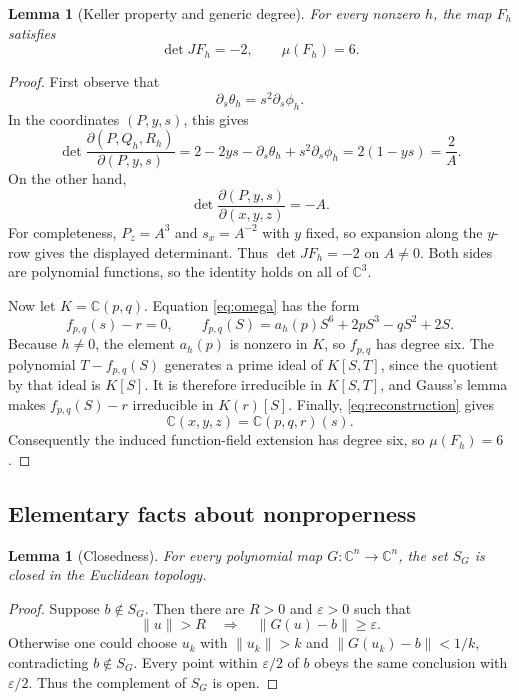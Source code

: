 \documentclass[11pt]{article}
\newtheorem{lemma}[theorem]{Lemma}
\newcommand{\C}{\mathbb{C}}
\begin{document}
\begin{lemma}[Keller property and generic degree]
\label{lem:keller-degree}
For every nonzero $h$, the map $F_h$ satisfies
\[
 \det JF_h=-2,
 \qquad
 \mu(F_h)=6.
\]
\end{lemma}

\begin{proof}
First observe that
\[
 \partial_s\theta_h=s^2\partial_s\phi_h.
\]
In the coordinates $(P,y,s)$, this gives
\[
 \det\frac{\partial(P,Q_h,R_h)}{\partial(P,y,s)}
 =2-2ys-\partial_s\theta_h+s^2\partial_s\phi_h
 =2(1-ys)=\frac{2}{A}.
\]
On the other hand,
\[
 \det\frac{\partial(P,y,s)}{\partial(x,y,z)}=-A.
\]
For completeness, $P_z=A^3$ and $s_x=A^{-2}$ with $y$ fixed, so expansion
along the $y$-row gives the displayed determinant.  Thus $\det JF_h=-2$ on
$A\ne0$.  Both sides are polynomial functions, so the identity holds on all
of $\C^3$.

Now let $K=\C(p,q)$.  Equation \eqref{eq:omega} has the form
\[
 f_{p,q}(s)-r=0,
 \qquad
 f_{p,q}(S)=a_h(p)S^6+2pS^3-qS^2+2S.
\]
Because $h\ne0$, the element $a_h(p)$ is nonzero in $K$, so $f_{p,q}$ has
degree six.  The polynomial $T-f_{p,q}(S)$ generates a prime ideal of
$K[S,T]$, since the quotient by that ideal is $K[S]$.  It is therefore
irreducible in $K[S,T]$, and Gauss's lemma makes $f_{p,q}(S)-r$ irreducible
in $K(r)[S]$.  Finally, \eqref{eq:reconstruction} gives
\[
 \C(x,y,z)=\C(p,q,r)(s).
\]
Consequently the induced function-field extension has degree six, so
$\mu(F_h)=6$.
\end{proof}

\subsection{Elementary facts about nonproperness}

\begin{lemma}[Closedness]
\label{lem:closed}
For every polynomial map $G:\C^n\to\C^n$, the set $S_G$ is closed in the
Euclidean topology.
\end{lemma}

\begin{proof}
Suppose $b\notin S_G$.  Then there are $R>0$ and $\varepsilon>0$ such that
\[
 \lVert u\rVert>R
 \quad\Longrightarrow\quad
 \lVert G(u)-b\rVert\ge\varepsilon.
\]
Otherwise one could choose $u_k$ with $\lVert u_k\rVert>k$ and
$\lVert G(u_k)-b\rVert<1/k$, contradicting $b\notin S_G$.  Every point
within $\varepsilon/2$ of $b$ obeys the same conclusion with
$\varepsilon/2$.  Thus the complement of $S_G$ is open.
\end{proof}
\end{document}
